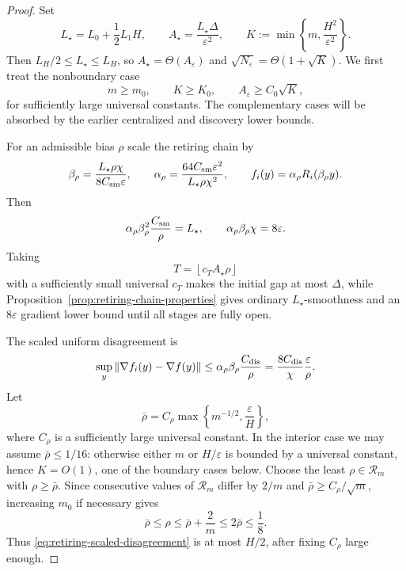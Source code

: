 \documentclass[11pt,a4paper]{article}
\newcommand{\eps}{\varepsilon}
\newcommand{\norm}[1]{\left\lVert #1\right\rVert}
\theoremstyle{remark}
\begin{document}
\begin{proof}
Set
\[
 L_\star=L_0+\frac12L_1H,
 \qquad
 A_\star=\frac{L_\star\Delta}{\eps^2},
 \qquad
 K:=\min\left\{m,\frac{H^2}{\eps^2}\right\}.
\]
Then $L_H/2\le L_\star\le L_H$, so $A_\star=\Theta(A_\eps)$ and
$\sqrt{N_\eps}=\Theta(1+\sqrt K)$.  We first treat the nonboundary case
\begin{equation}
 m\ge m_0,\qquad K\ge K_0,\qquad
 A_\eps\ge C_0\sqrt K,
 \label{eq:retiring-interior-case}
\end{equation}
for sufficiently large universal constants.  The complementary cases will be
absorbed by the earlier centralized and discovery lower bounds.

For an admissible bias $\rho$ scale the retiring chain by
\begin{equation}
 \beta_\rho=\frac{L_\star\rho\chi}
 {8C_{\rm sm}\eps},
 \qquad
 \alpha_\rho=\frac{64C_{\rm sm}\eps^2}
 {L_\star\rho\chi^2},
 \qquad
 f_i(y)=\alpha_\rho R_i(\beta_\rho y).
 \label{eq:retiring-scaling}
\end{equation}
Then
\[
 \alpha_\rho\beta_\rho^2\frac{C_{\rm sm}}\rho=L_\star,
 \qquad
 \alpha_\rho\beta_\rho\chi=8\eps.
\]
Taking
\begin{equation}
 T=\left\lfloor c_TA_\star\rho\right\rfloor
 \label{eq:retiring-stage-count}
\end{equation}
with a sufficiently small universal $c_T$ makes the initial gap at most
$\Delta$, while Proposition~\ref{prop:retiring-chain-properties} gives
ordinary $L_\star$-smoothness and an $8\eps$ gradient lower bound until all
stages are fully open.

The scaled uniform disagreement is
\begin{equation}
 \sup_y\norm{\nabla f_i(y)-\nabla f(y)}
 \le\alpha_\rho\beta_\rho\frac{C_{\rm dis}}\rho
 =\frac{8C_{\rm dis}}\chi\frac{\eps}{\rho}.
 \label{eq:retiring-scaled-disagreement}
\end{equation}
Let
\begin{equation}
 \bar\rho=C_\rho\max\left\{m^{-1/2},\frac\eps H\right\},
 \label{eq:retiring-bias-choice}
\end{equation}
where $C_\rho$ is a sufficiently large universal constant.  In the interior
case we may assume $\bar\rho\le1/16$: otherwise either $m$ or $H/\eps$ is
bounded by a universal constant, hence $K=O(1)$, one of the boundary cases
below.  Choose the least $\rho\in\mathcal R_m$ with $\rho\ge\bar\rho$.
Since consecutive values of $\mathcal R_m$ differ by $2/m$ and
$\bar\rho\ge C_\rho/\sqrt m$, increasing $m_0$ if necessary gives
\begin{equation}
 \bar\rho\le\rho\le\bar\rho+\frac2m\le2\bar\rho\le\frac18.
 \label{eq:retiring-grid-rounding}
\end{equation}
Thus \eqref{eq:retiring-scaled-disagreement} is at most $H/2$, after fixing
$C_\rho$ large enough.


\end{proof}
\end{document}
